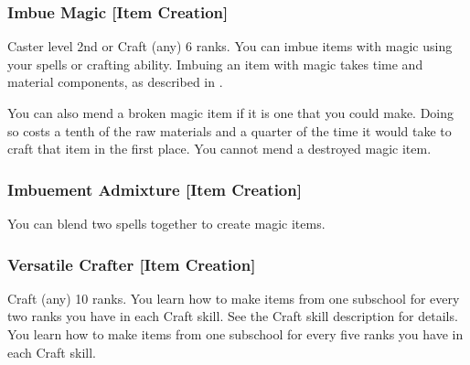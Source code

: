 \subsubsection{Imbue Magic [Item Creation]}
 Caster level 2nd or Craft (any) 6 ranks.
 You can imbue items with magic using your spells or crafting ability. Imbuing an item with magic takes time and material components, as described in .

You can also mend a broken magic item if it is one that you could make. Doing so costs a tenth of the raw materials and a quarter of the time it would take to craft that item in the first place. You cannot mend a destroyed magic item.

\subsubsection{Imbuement Admixture [Item Creation]}
 You can blend two spells together to create magic items. 

\subsubsection{Versatile Crafter [Item Creation]}
 Craft (any) 10 ranks.
 You learn how to make items from one subschool for every two ranks you have in each Craft skill. See the Craft skill description for details.
 You learn how to make items from one subschool for every five ranks you have in each Craft skill.
